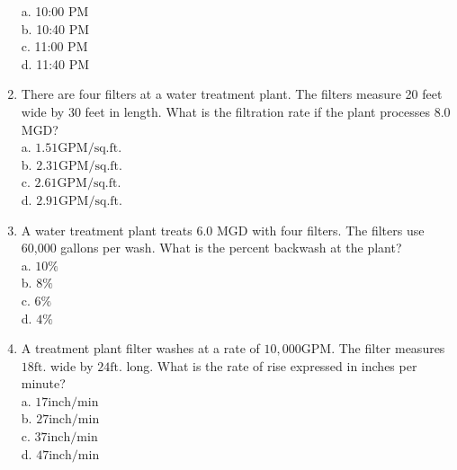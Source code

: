 \begin{enumerate}
a. 10:00 PM\\
b. 10:40 PM\\
c. 11:00 PM\\
d. 11:40 PM\\
\item There are four filters at a water treatment plant. The filters measure 20 feet wide by 30 feet in length. What is the filtration rate if the plant processes 8.0 MGD?\\
a. $1.51 \mathrm{GPM} / \mathrm{sq} . \mathrm{ft}$.\\
b. $2.31 \mathrm{GPM} / \mathrm{sq} . \mathrm{ft}$.\\
c. $2.61 \mathrm{GPM} / \mathrm{sq} . \mathrm{ft}$.\\
d. $2.91 \mathrm{GPM} / \mathrm{sq} . \mathrm{ft}$.\\
\item A water treatment plant treats 6.0 MGD with four filters. The filters use 60,000 gallons per wash. What is the percent backwash at the plant?\\
a. $10 \%$\\
b. $8 \%$\\
c. $6 \%$\\
d. $4 \%$\\
\item A treatment plant filter washes at a rate of $10,000 \mathrm{GPM}$. The filter measures $18 \mathrm{ft}$. wide by $24 \mathrm{ft}$. long. What is the rate of rise expressed in inches per minute?\\
a. $17 \mathrm{inch} / \mathrm{min}$\\
b. $27 \mathrm{inch} / \mathrm{min}$\\
c. $37 \mathrm{inch} / \mathrm{min}$\\
d. $47 \mathrm{inch} / \mathrm{min}$\\
\end{enumerate}
\newpage
